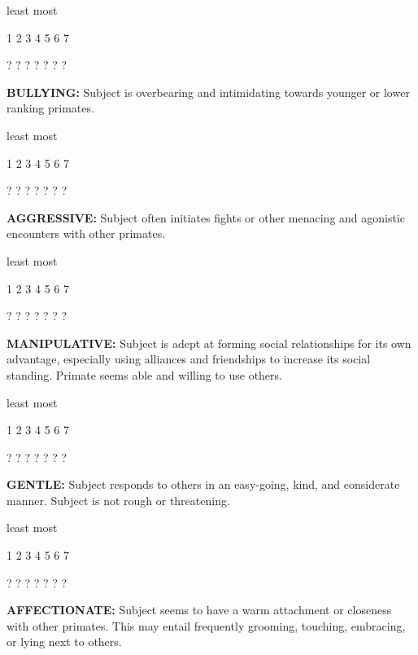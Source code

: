 \documentclass{article} %
\begin{document}
\noindent least                            most

  1    2    3    4    5    6    7   

  ?    ?    ?    ?    ?    ?    ?   

\noindent \textbf{ }

\noindent \textbf{BULLYING:} Subject is overbearing and intimidating towards younger or lower ranking primates. 

\noindent  

\noindent least                            most

  1    2    3    4    5    6    7   

  ?    ?    ?    ?    ?    ?    ?   

\noindent  

\textbf{   }

\noindent \textbf{AGGRESSIVE:} Subject often initiates fights or other menacing and agonistic encounters with other primates. 

\noindent  

\noindent least                            most

  1    2    3    4    5    6    7   

  ?    ?    ?    ?    ?    ?    ?   

\noindent \textbf{ }

\noindent \textbf{MANIPULATIVE:} Subject is adept at forming social relationships for its own advantage, especially using alliances and friendships to increase its social standing. Primate seems able and willing to use others. 

\noindent  

\noindent least                            most

  1    2    3    4    5    6    7   

  ?    ?    ?    ?    ?    ?    ?   

\noindent  

\noindent \textbf{GENTLE:} Subject responds to others in an easy-going, kind, and considerate manner. Subject is not rough or threatening. 

\noindent  

\noindent least                            most

  1    2    3    4    5    6    7   

  ?    ?    ?    ?    ?    ?    ?   

\noindent  

\noindent \textbf{AFFECTIONATE:} Subject seems to have a warm attachment or closeness with other primates. This may entail frequently grooming, touching, embracing, or lying next to others. 
\end{document}
